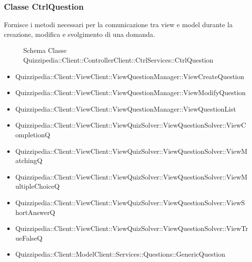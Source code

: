 \subsubsection{Classe CtrlQuestion}
Fornisce i metodi necessari per la comunicazione tra view e model durante la creazione, modifica e svolgimento di una domanda.
\begin{figure}[H]
\centering
\noindent{}
\caption[Schema Classe CtrlQuestion]{Schema Classe Quizzipedia::Client::ControllerClient::CtrlServices::CtrlQuestion}
\end{figure}
\begin{itemize}
\item Quizzipedia::Client::ViewClient::ViewQuestionManager::ViewCreateQuestion
\item Quizzipedia::Client::ViewClient::ViewQuestionManager::ViewModifyQuestion
\item Quizzipedia::Client::ViewClient::ViewQuestionManager::ViewQuestionList
\item Quizzipedia::Client::ViewClient::ViewQuizSolver::ViewQuestionSolver::ViewCompletionQ
\item Quizzipedia::Client::ViewClient::ViewQuizSolver::ViewQuestionSolver::ViewMatchingQ
\item Quizzipedia::Client::ViewClient::ViewQuizSolver::ViewQuestionSolver::ViewMultipleChoiceQ
\item Quizzipedia::Client::ViewClient::ViewQuizSolver::ViewQuestionSolver::ViewShortAnswerQ
\item Quizzipedia::Client::ViewClient::ViewQuizSolver::ViewQuestionSolver::ViewTrueFalseQ
\end{itemize}
\begin{itemize}
\item Quizzipedia::Client::ModelClient::Services::Questions::GenericQuestion
\end{itemize}
